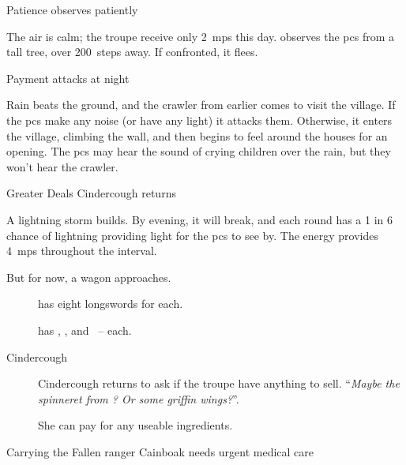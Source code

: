 \documentclass[10pt,twoside]{book}
\begin{document}
\begin{figure}[t]
  \chitincrawler
\end{figure}%

{Patience}%
{ observes patiently}%

The air is calm; the troupe receive only 2~\glspl{mp} this day.
 observes the \glspl{pc} from a tall tree, over 200~\glspl{step} away.
If confronted, it flees.

{Payment}%
{ attacks at night}%

Rain beats the ground, and the \gls{crawler} from earlier comes to visit the \gls{village}.
If the \glspl{pc} make any noise (or have any light) it attacks them.
Otherwise, it enters the \gls{village}, climbing the wall, and then begins to feel around the houses for an opening.
The \glspl{pc} may hear the sound of crying children over the rain, but they won't hear the \gls{crawler}.


{Greater Deals}%
{Cindercough returns}%

A lightning storm builds.
By evening, it will break, and each \gls{round} has a 1 in 6 chance of lightning providing light for the \glspl{pc} to see by.
The energy provides 4~\glspl{mp} throughout the \gls{interval}.

But for now, a wagon approaches.

\begin{description}
  \item[\composeHumanName]
  has eight longswords for  each.
  \item[\composeHumanName]
  has \rations, \rations, and \rations\ --  each.
  \item[Cindercough]
  Cindercough returns to ask if the troupe have anything to sell.
  ``\textit{Maybe the spinneret from ?  Or some \gls{griffin} wings?}''.

  She can pay  for any useable \glspl{ingredient}.
\end{description}


\begin{figure}[t]
  \chitincrawler
  \setcounter{gold}{\value{xp}}
\end{figure}%

{Carrying the Fallen}%
{\Gls{ranger} Cainboak needs urgent medical care}%
\end{document}
